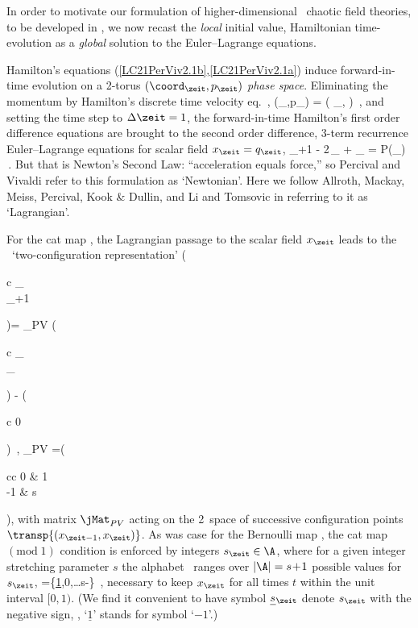 In order to motivate our formulation of higher-dimensional \spt\ chaotic
field theories, to be developed in , we now recast the
\emph{local} initial value, Hamiltonian time-evolution  as a
\emph{global} solution to the Euler–Lagrange equations.

Hamilton's equations (\ref{LC21PerViv2.1b},\ref{LC21PerViv2.1a}) induce
forward-in-time evolution on a 2-torus  $(\coord_{\zeit},p_\zeit)$ {\em
phase space}.
Eliminating the momentum by Hamilton's discrete time velocity
eq.~,
\beq
(\coord_\zeit,p_\zeit) =
\left(
    \ssp_{\zeit},
\right)
\,,
and setting the time step to $\Delta\zeit=1$, the
forward-in-time Hamilton's first order difference equations are brought
to the second order difference, 3-term recurrence Euler–Lagrange equations
for scalar field $\ssp_{\zeit}=q_\zeit$,
\beq
\ssp_{\zeit+1} - 2\,\ssp_{\zeit} + \ssp_{} = P(\ssp_{\zeit})
\,.
But that is Newton's Second Law: ``acceleration equals
force,'' so Percival and Vivaldi refer to this formulation as
`Newtonian'. Here we follow Allroth, Mackay, Meiss,
Percival, Kook \& Dullin,
and Li and Tomsovic in referring  to it as `Lagrangian'.

For the cat map , the Lagrangian passage
 to the  scalar field  $\ssp_{\zeit}$ leads to the \PV\
`two-configuration representation'
\beq
 \left(\begin{array}{c}
 \ssp_{\zeit}  \\
 \ssp_{\zeit+1}
 \end{array} \right )=
 \jMat_{PV} \left(\begin{array}{c}
 \ssp_{}  \\
 \ssp_{\zeit}
 \end{array} \right ) %
 - \left(\begin{array}{c}
 0  \\
 \Ssym{\zeit}
 \end{array} \right )
 \,,  \qquad
 {\jMat_{PV}} =\left(\begin{array}{cc}
 0 & 1 \\
 -1 & s
 \end{array} \right ),
\ee{LC21PerViv}
with matrix $\jMat_{PV}$ acting on the 2\dmn\ space of successive
configuration points $\transp{(\ssp_{\zeit-1},\ssp_{\zeit})}$. As was
case for the Bernoulli map \refeq{1stepDiffEq}, the cat map
$(\mbox{mod}\;1)$ condition  is enforced by integers
$\Ssym{\zeit}\in  \A$, where for a given integer stretching parameter $s$
the alphabet \A\ ranges over $|\A|={s}\!+\!1$ possible values for
$\Ssym{\zeit}$,
\beq
\A=\{\underline{1},0,\dots s\!-\}
\,,
necessary  to keep $\ssp_{\zeit}$ for all times $t$ within the unit
interval $[0,1)$. (We find it convenient to have symbol
$\underline{\Ssym{}}{}_{\zeit}$ denote $\Ssym{\zeit}$ with the negative
sign, \ie, `$\underline{1}$' stands for symbol `$-1$'.)



